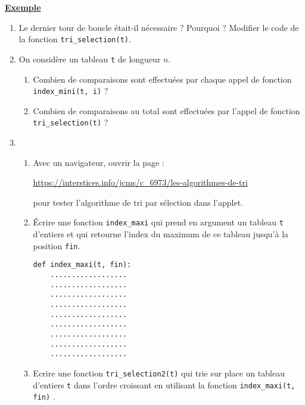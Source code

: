 \documentclass[a4paper, french, 12pt]{article}  %
\newcounter{thme}
\newcounter{def}
\newcounter{exple}
\newenvironment{exemple}[1]
{\par \medskip  \noindent \addtocounter{exple}{1} \underline{\textbf{Exemple} \textbf{\theexple} } \hspace{0.5cm}{\itshape #1} \vspace*{10pt} \par}
{\par \medskip }
\newcounter{alg}
\newlength{\parpointille}
\newcommand{\Pointilles}[2]{%
\multido{}{#1}{%
\makebox[#2]{\dotfill}\\[\parpointille]
}}
\begin{document}
\begin{exemple}{Implémentation du tri par sélection}
\begin{enumerate}
\begin{center}
	
	\end{center}	
	

\item Le dernier tour de boucle était-il nécessaire ? Pourquoi ? Modifier le code de la fonction \verb+tri_selection(t)+.

\Pointilles{8}{\linewidth}


\newpage
	
	\item On considère un tableau \verb+t+ de longueur $n$. 
		\begin{enumerate}
			\item 	Combien de comparaisons sont effectuées par chaque appel de fonction \verb+index_mini(t, i)+ ?
			
			\Pointilles{3}{\linewidth}
			
			\item Combien de comparaisons au total sont effectuées par l'appel de fonction \verb+tri_selection(t)+ ?
			
			\Pointilles{5}{\linewidth}
			
		\end{enumerate}
		



	\item 
	
	\begin{enumerate}
	
			\item Avec  un navigateur, ouvrir la page :
	
	\begin{center}
	 \url{https://interstices.info/jcms/c_6973/les-algorithmes-de-tri}
	 \end{center}
	 
	  pour tester l'algorithme de tri par sélection dans l'applet.
	
		\item 	Écrire une fonction \verb+index_maxi+ qui prend en argument un tableau \verb+t+ d'entiers et qui retourne l'index du maximum de ce tableau jusqu'à  la position \verb+fin+.
	
	\medskip
	
	\begin{lstlisting}
def index_maxi(t, fin):
	..................
	..................
	..................
	..................
	..................
	..................
	..................
	..................
	..................	
	\end{lstlisting}
	
		\item Ecrire une fonction \verb+tri_selection2(t)+ qui trie sur place un tableau d'entiers \verb+t+ dans l'ordre croissant en utilisant la fonction \verb+index_maxi(t, fin)+ .
	

\end{enumerate}
\end{enumerate}
\end{exemple}
\end{document}

